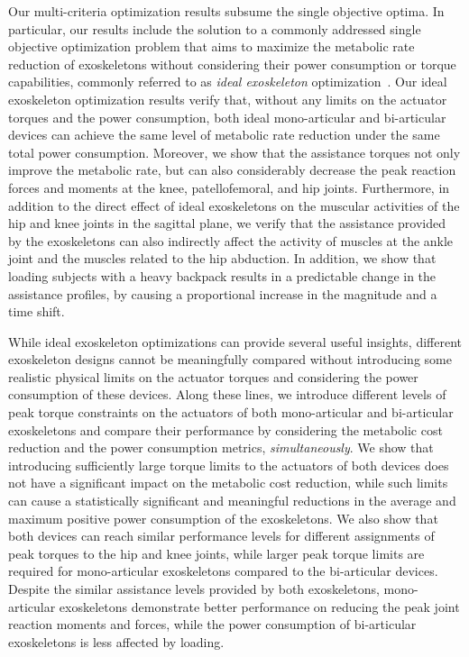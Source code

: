 \documentclass[10pt,letterpaper]{article}
\begin{document}
Our multi-criteria optimization results subsume the single objective optima. In particular, our results include the solution to a commonly addressed single objective optimization problem that aims to maximize the metabolic rate reduction of exoskeletons without considering their power consumption or torque capabilities, commonly referred to as \emph{ideal exoskeleton} optimization~\cite{Uchida2016_idealexo_running,Dembia2017}. Our ideal exoskeleton optimization results verify that, without any limits on the actuator torques and the power consumption, both ideal mono-articular and bi-articular devices can achieve the same level of metabolic rate reduction under the same total power consumption. Moreover, we show that the assistance torques not only improve the metabolic rate, but can also considerably decrease the peak reaction forces and moments at the knee, patellofemoral, and hip joints. Furthermore, in addition to the direct effect of ideal exoskeletons on the muscular activities of the hip and knee joints in the sagittal plane, we verify that the assistance provided by the exoskeletons can also indirectly affect the activity of muscles at the ankle joint and the muscles related to the hip abduction. In addition, we show that loading subjects with a heavy backpack results in a predictable change in the assistance profiles, by causing a proportional increase in the magnitude and a time shift. %

While ideal exoskeleton optimizations can provide several useful insights, different exoskeleton designs cannot be meaningfully compared without introducing some realistic physical limits on the actuator torques and considering the power consumption of these devices. Along these lines, we introduce different levels of peak torque constraints on the actuators of both mono-articular and bi-articular exoskeletons and compare their performance by considering the metabolic cost reduction and the power consumption metrics, \emph{simultaneously}. We show that introducing sufficiently large torque limits to the actuators of both devices does not have a significant impact on the metabolic cost reduction, while such limits can cause a statistically significant and meaningful reductions in the average and maximum positive power consumption of the exoskeletons. We also show that both devices can reach similar performance levels for different assignments of peak torques to the hip and knee joints, while larger peak torque limits are required for mono-articular exoskeletons compared to the bi-articular devices. Despite the similar assistance levels provided by both exoskeletons, mono-articular exoskeletons demonstrate better performance on reducing the peak joint reaction moments and forces, while the power consumption of bi-articular exoskeletons is less affected by loading. %
\end{document}
